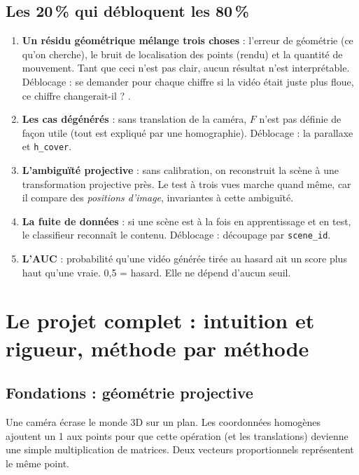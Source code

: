 \documentclass[11pt,a4paper]{article}
\begin{document}
\subsection{Les 20\,\% qui débloquent les 80\,\%}
\begin{enumerate}
  \item \textbf{Un résidu géométrique mélange trois choses} : l'erreur de géométrie (ce qu'on cherche),
        le bruit de localisation des points (rendu) et la quantité de mouvement. Tant que ceci n'est
        pas clair, aucun résultat n'est interprétable. Déblocage : se demander pour chaque chiffre
        \og si la vidéo était juste plus floue, ce chiffre changerait-il ? \fg.
  \item \textbf{Les cas dégénérés} : sans translation de la caméra, $F$ n'est pas définie de façon
        utile (tout est expliqué par une homographie). Déblocage : la parallaxe et \texttt{h\_cover}.
  \item \textbf{L'ambiguïté projective} : sans calibration, on reconstruit la scène à une
        transformation projective près. Le test à trois vues marche quand même, car il compare des
        \emph{positions d'image}, invariantes à cette ambiguïté.
  \item \textbf{La fuite de données} : si une scène est à la fois en apprentissage et en test, le
        classifieur reconnaît le contenu. Déblocage : découpage par \texttt{scene\_id}.
  \item \textbf{L'AUC} : probabilité qu'une vidéo générée tirée au hasard ait un score plus haut
        qu'une vraie. 0,5 = hasard. Elle ne dépend d'aucun seuil.
\end{enumerate}

\section{Le projet complet : intuition et rigueur, méthode par méthode}

\subsection{Fondations : géométrie projective}

\begin{intuition}
Une caméra écrase le monde 3D sur un plan. Les coordonnées homogènes ajoutent un 1 aux points pour
que cette opération (et les translations) devienne une simple multiplication de matrices. Deux
vecteurs proportionnels représentent le même point.
\end{intuition}
\end{document}
